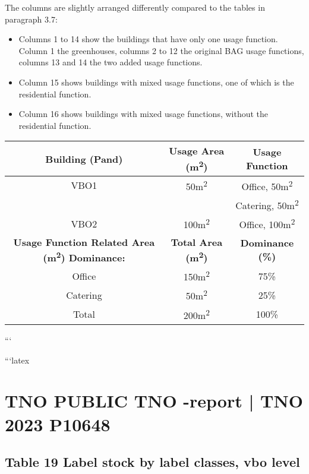 \documentclass{article}
\begin{document}
The columns are slightly arranged differently compared to the tables in paragraph 3.7:
\begin{itemize}
    \item Columns 1 to 14 show the buildings that have only one usage function. Column 1 the greenhouses, columns 2 to 12 the original BAG usage functions, columns 13 and 14 the two added usage functions.
    \item Column 15 shows buildings with mixed usage functions, one of which is the residential function.
    \item Column 16 shows buildings with mixed usage functions, without the residential function.
\end{itemize}

\begin{table}[h!]
\centering
\begin{tabular}{|c|c|c|}
    \hline
    \textbf{Building (Pand)} & \textbf{Usage Area (m\textsuperscript{2})} & \textbf{Usage Function}  \\
    \hline
    VBO1 & 50m\textsuperscript{2} & Office, 50m\textsuperscript{2} \\
    & & Catering, 50m\textsuperscript{2} \\
    \hline
    VBO2 & 100m\textsuperscript{2} & Office, 100m\textsuperscript{2} \\
    \hline
    \textbf{Usage Function Related Area (m\textsuperscript{2}) Dominance:} & \textbf{Total Area (m\textsuperscript{2})} & \textbf{Dominance (\%)}  \\
    \hline
    Office & 150m\textsuperscript{2} & 75\% \\
    Catering & 50m\textsuperscript{2} & 25\% \\
    \hline
    Total & 200m\textsuperscript{2} & 100\% \\
    \hline
\end{tabular}
\end{table}

```

```latex
\section*{TNO PUBLIC TNO -report | TNO 2023 P10648}

\subsection*{Table 19 Label stock by label classes, vbo level}
 
\end{document}

